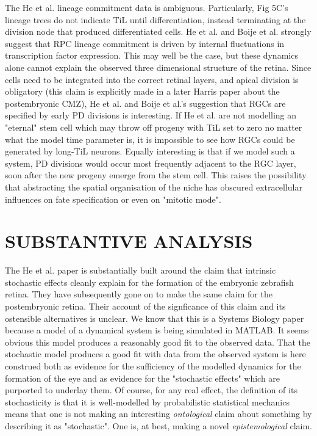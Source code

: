 \documentclass{ut-thesis}
\begin{document}
The He et al. lineage commitment data is ambiguous. Particularly, Fig 5C's lineage trees do not indicate TiL until differentiation, instead terminating at the division node that produced differentiated cells. He et al. and Boije et al. strongly suggest that RPC lineage commitment is driven by internal fluctuations in transcription factor expression. This may well be the case, but these dynamics alone cannot explain the observed three dimensional structure of the retina. Since cells need to be integrated into the correct retinal layers, and apical division is obligatory (this claim is explicitly made in a later Harris paper about the postembryonic CMZ\cite{}), He et al. and Boije et al.'s suggestion that RGCs are specified by early PD divisions is interesting. If He et al. are not modelling an "eternal" stem cell which may throw off progeny with TiL set to zero no matter what the model time parameter is, it is impossible to see how RGCs could be generated by long-TiL neurons. Equally interesting is that if we model such a system, PD divisions would occur most frequently adjacent to the RGC layer, soon after the new progeny emerge from the stem cell. This raises the possibility that abstracting the spatial organisation of the niche has obscured extracellular influences on fate specification or even on "mitotic mode". 

\bigskip

\section{SUBSTANTIVE ANALYSIS}

The He et al. paper is substantially built around the claim that intrinsic stochastic effects cleanly explain for the formation of the embryonic zebrafish retina. They have subsequently gone on to make the same claim for the postembryonic retina. Their account of the signficance of this claim and its ostensible alternatives is unclear. We know that this is a Systems Biology paper because a model of a dynamical system is being simulated in MATLAB. It seems obvious this model produces a reasonably good fit to the observed data. That the stochastic model produces a good fit with data from the observed system is here construed both as evidence for the sufficiency of the modelled dynamics for the formation of the eye and as evidence for the "stochastic effects" which are purported to underlay them. Of course, for any real effect, the definition of its stochasticity is that it is well-modelled by probabilistic statistical mechanics means that one is not making an interesting \textit{ontological} claim about something by describing it as "stochastic". One is, at best, making a novel \textit{epistemological} claim.
\end{document}
